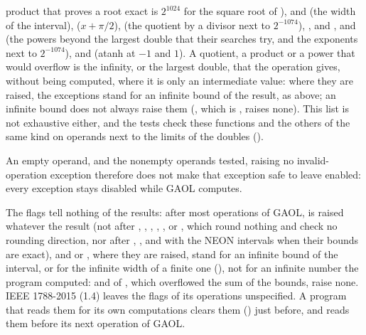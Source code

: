 \begin{itemize}
  product that proves a root exact is $2^{1024}$ for the square root of
  ),  and  (the
  width of the interval),  ($x+\pi/2$),
   (the quotient by a divisor next to $2^{-1074}$),
  ,  and ,
   and  (the powers beyond the
  largest double that their searches try, and the exponents next to
  $2^{-1074}$), and  (atanh at $-1$ and $1$). A quotient,
  a product or a power that would overflow is the infinity, or the largest
  double, that the operation gives, without being computed, where it is only
  an intermediate value: where they are raised, the exceptions stand for an
  infinite bound of the result, as above; an infinite bound does not always raise
  them (, which is
  , raises none).
  This list is not exhaustive either, and the tests check
  these functions and the others of the same kind on operands next to the
  limits of the doubles ().\newinvfive
\end{itemize}

\noindent
An empty operand, and the nonempty operands tested, raising no
invalid-operation exception therefore does not make that exception safe to
leave enabled: every exception stays disabled while GAOL computes.\newinvfive

\medskip
The flags tell nothing of the results: after most operations of GAOL,
 is raised whatever the result (not after
, , \code{\&}, \code{|}, ,  or
, which round nothing and check no rounding direction, nor after
\code{+}, \code{-}, \code{/} and  with the NEON intervals when
their bounds are exact), and  or ,
where they are raised, stand for an infinite bound of the interval, or for the
infinite width of a finite one (),
not for an infinite number the program computed:  and  of
, which overflowed the sum of the
bounds, raise none. IEEE 1788-2015 \cite{IEEE1788:2015} (1.4) leaves the flags of
its operations unspecified. A program that reads them for its own
computations clears them () just
before, and reads them before its next operation of GAOL.\newinvfive

